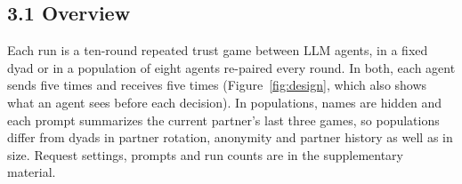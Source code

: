 \providecommand{\CHECK}[1]{\textcolor{orange}{[#1]}}

\subsection{3.1 Overview}\label{overview}


Each run is a ten-round repeated trust game between LLM agents, in a fixed dyad or in a population of eight agents re-paired every round. In both, each agent sends five times and receives five times (Figure~\ref{fig:design}, which also shows what an agent sees before each decision). In populations, names are hidden and each prompt summarizes the current partner's last three games, so populations differ from dyads in partner rotation, anonymity and partner history as well as in size. Request settings, prompts and run counts are in the supplementary material.

